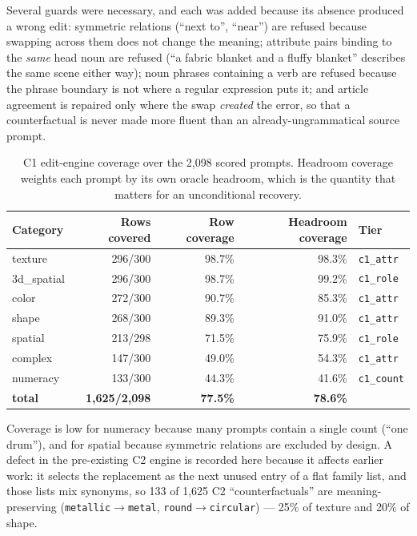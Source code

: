 \documentclass[10pt]{article}
\newcommand{\obs}[1]{\textcolor{observedblue}{#1}}
\begin{document}
Several guards were necessary, and each was added because its absence produced a wrong edit:
symmetric relations (``next to'', ``near'') are refused because swapping across them does not change
the meaning; attribute pairs binding to the \emph{same} head noun are refused (``a fabric blanket and
a fluffy blanket'' describes the same scene either way); noun phrases containing a verb are refused
because the phrase boundary is not where a regular expression puts it; and article agreement is
repaired only where the swap \emph{created} the error, so that a counterfactual is never made more
fluent than an already-ungrammatical source prompt.

\begin{table}[h]
\centering
\caption{C1 edit-engine coverage over the 2,098 scored prompts. Headroom coverage weights each
prompt by its own oracle headroom, which is the quantity that matters for an unconditional
recovery.}
\label{tab:c1coverage}
\small
\begin{tabular}{@{}lrrrl@{}}
\toprule
Category & Rows covered & Row coverage & Headroom coverage & Tier \\
\midrule
texture     & \obs{296/300} & \obs{98.7\%} & \obs{98.3\%} & \texttt{c1\_attr} \\
3d\_spatial & \obs{296/300} & \obs{98.7\%} & \obs{99.2\%} & \texttt{c1\_role} \\
color       & \obs{272/300} & \obs{90.7\%} & \obs{85.3\%} & \texttt{c1\_attr} \\
shape       & \obs{268/300} & \obs{89.3\%} & \obs{91.0\%} & \texttt{c1\_attr} \\
spatial     & \obs{213/298} & \obs{71.5\%} & \obs{75.9\%} & \texttt{c1\_role} \\
complex     & \obs{147/300} & \obs{49.0\%} & \obs{54.3\%} & \texttt{c1\_attr} \\
numeracy    & \obs{133/300} & \obs{44.3\%} & \obs{41.6\%} & \texttt{c1\_count} \\
\midrule
\textbf{total} & \obs{\textbf{1,625/2,098}} & \obs{\textbf{77.5\%}} & \obs{\textbf{78.6\%}} & \\
\bottomrule
\end{tabular}
\end{table}

Coverage is low for numeracy because many prompts contain a single count (``one drum''), and for
spatial because symmetric relations are excluded by design. A defect in the pre-existing C2 engine
is recorded here because it affects earlier work: it selects the replacement as the next unused
entry of a flat family list, and those lists mix synonyms, so \obs{133 of 1,625} C2
``counterfactuals'' are meaning-preserving (\texttt{metallic}$\rightarrow$\texttt{metal},
\texttt{round}$\rightarrow$\texttt{circular}) --- \obs{25\%} of texture and \obs{20\%} of shape.
\end{document}
